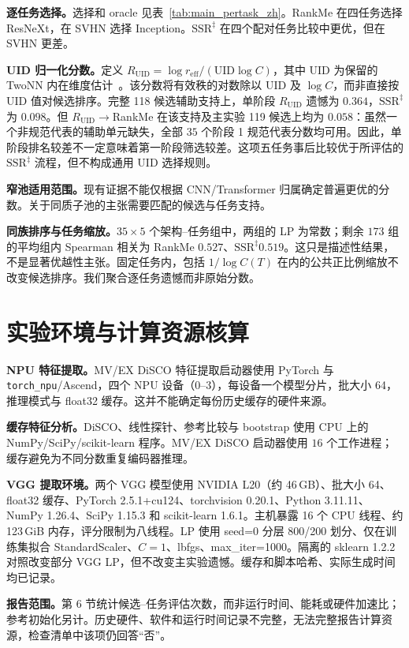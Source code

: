 \documentclass{article}
\newcommand{\reff}{\ensuremath{r_{\mathrm{eff}}}\xspace}
\newcommand{\UID}{\ensuremath{\mathrm{UID}}\xspace}
\newcommand{\SSRdag}{\ensuremath{\mathrm{SSR}^{\ddagger}}\xspace}
\begin{document}
\textbf{逐任务选择。}选择和 oracle 见表~\ref{tab:main_pertask_zh}。RankMe 在四任务选择 ResNeXt，在 SVHN 选择 Inception。\SSRdag 在四个配对任务比较中更优，但在 SVHN 更差。



\textbf{UID 归一化分数。}定义 $R_{\mathrm{UID}}=\log\reff/(\UID\log C)$，其中 UID 为保留的 TwoNN 内在维度估计~\citep{facco2017estimating}。该分数将有效秩的对数除以 UID 及 $\log C$，而非直接按 UID 值对候选排序。完整 118 候选辅助支持上，单阶段 $R_{\mathrm{UID}}$ 遗憾为 $0.364$，\SSRdag 为 $0.098$。但 $R_{\mathrm{UID}}\to$RankMe 在该支持及主实验 119 候选上均为 $0.058$：虽然一个非规范代表的辅助单元缺失，全部 $35$ 个阶段 1 规范代表分数均可用。因此，单阶段排名较差不一定意味着第一阶段筛选较差。这项五任务事后比较优于所评估的 \SSRdag 流程，但不构成通用 UID 选择规则。

\textbf{窄池适用范围。}现有证据不能仅根据 CNN/Transformer 归属确定普遍更优的分数。关于同质子池的主张需要匹配的候选与任务支持。

\textbf{同族排序与任务缩放。}$35\times5$ 个架构--任务组中，两组的 LP 为常数；剩余 $173$ 组的平均组内 Spearman 相关为 RankMe $0.527$、\SSRdag $0.519$。这只是描述性结果，不是显著优越性主张。固定任务内，包括 $1/\log C(T)$ 在内的公共正比例缩放不改变候选排序。我们聚合逐任务遗憾而非原始分数。

\section{实验环境与计算资源核算}
\label{app:environment}

\textbf{NPU 特征提取。}MV/EX DiSCO 特征提取启动器使用 PyTorch 与 \texttt{torch\_npu}/Ascend，四个 NPU 设备（0--3），每设备一个模型分片，批大小 64，推理模式与 float32 缓存。这并不能确定每份历史缓存的硬件来源。

\textbf{缓存特征分析。}DiSCO、线性探针、参考比较与 bootstrap 使用 CPU 上的 NumPy/SciPy/scikit-learn 程序。MV/EX DiSCO 启动器使用 $16$ 个工作进程；缓存避免为不同分数重复编码器推理。

\textbf{VGG 提取环境。}两个 VGG 模型使用 NVIDIA L20（约 46\,GB）、批大小 64、float32 缓存、PyTorch 2.5.1+cu124、torchvision 0.20.1、Python 3.11.11、NumPy 1.26.4、SciPy 1.15.3 和 scikit-learn 1.6.1。主机暴露 16 个 CPU 线程、约 123\,GiB 内存，评分限制为八线程。LP 使用 seed=0 分层 800/200 划分、仅在训练集拟合 StandardScaler、$C=1$、lbfgs、max\_iter=1000。隔离的 sklearn 1.2.2 对照改变部分 VGG LP，但不改变主实验遗憾。缓存和脚本哈希、实际生成时间均已记录。

\textbf{报告范围。}第 6 节统计候选--任务评估次数，而非运行时间、能耗或硬件加速比；参考初始化另计。历史硬件、软件和运行时间记录不完整，无法完整报告计算资源，检查清单中该项仍回答“否”。

\clearpage
\renewcommand{\thepage}{C\arabic{page}}
\setcounter{page}{1}

\end{document}
